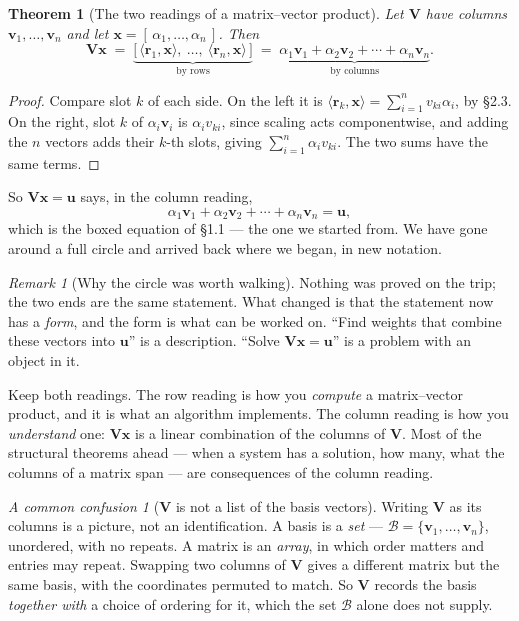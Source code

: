 \documentclass[11pt]{article}
\theoremstyle{plain}
\newtheorem{thm}{Theorem}[section]
\theoremstyle{definition}
\theoremstyle{remark}
\newtheorem*{rmk}{Remark}
\newtheorem*{warn}{A common confusion}
\newcommand{\vc}[1]{\mathbf{#1}}        %
\newcommand{\mt}[1]{\mathbf{#1}}        %
\newcommand{\bas}{\mathcal{B}}
\begin{document}
\begin{thm}[The two readings of a matrix--vector product]
Let $\mt{V}$ have columns $\vc{v}_1,\dots,\vc{v}_n$ and let
$\vc{x}=[\,\alpha_1,\dots,\alpha_n\,]$. Then
\[
  \mt{V}\vc{x}
  \;=\;
  \underbrace{\bigl[\,\langle\vc{r}_1,\vc{x}\rangle,\ \dots,\
                      \langle\vc{r}_n,\vc{x}\rangle\,\bigr]}_{\text{by rows}}
  \;=\;
  \underbrace{\alpha_1\vc{v}_1 + \alpha_2\vc{v}_2 + \cdots
              + \alpha_n\vc{v}_n}_{\text{by columns}} .
\]
\end{thm}

\begin{proof}
Compare slot $k$ of each side. On the left it is
$\langle\vc{r}_k,\vc{x}\rangle=\sum_{i=1}^{n}v_{ki}\alpha_i$, by \S2.3. On the
right, slot $k$ of $\alpha_i\vc{v}_i$ is $\alpha_i v_{ki}$, since scaling acts
componentwise, and adding the $n$ vectors adds their $k$-th slots, giving
$\sum_{i=1}^{n}\alpha_i v_{ki}$. The two sums have the same terms.
\end{proof}

\noindent So $\mt{V}\vc{x}=\vc{u}$ says, in the column reading,
\[
  \alpha_1\vc{v}_1 + \alpha_2\vc{v}_2 + \cdots + \alpha_n\vc{v}_n = \vc{u} ,
\]
which is the boxed equation of \S1.1 --- the one we started from. We have gone
around a full circle and arrived back where we began, in new notation.

\begin{rmk}[Why the circle was worth walking]
Nothing was proved on the trip; the two ends are the same statement. What
changed is that the statement now has a \emph{form}, and the form is what can be
worked on. ``Find weights that combine these vectors into $\vc{u}$'' is a
description. ``Solve $\mt{V}\vc{x}=\vc{u}$'' is a problem with an object in it.

Keep both readings. The row reading is how you \emph{compute} a matrix--vector
product, and it is what an algorithm implements. The column reading is how you
\emph{understand} one: $\mt{V}\vc{x}$ is a linear combination of the columns of
$\mt{V}$. Most of the structural theorems ahead --- when a system has a
solution, how many, what the columns of a matrix span --- are consequences of the
column reading.
\end{rmk}

\begin{warn}[$\mt{V}$ is not a list of the basis vectors]
Writing $\mt{V}$ as its columns is a picture, not an identification. A basis is a
\emph{set} --- $\bas=\{\vc{v}_1,\dots,\vc{v}_n\}$, unordered, with no repeats. A
matrix is an \emph{array}, in which order matters and entries may repeat.
Swapping two columns of $\mt{V}$ gives a different matrix but the same basis,
with the coordinates permuted to match. So $\mt{V}$ records the basis
\emph{together with} a choice of ordering for it, which the set $\bas$ alone does
not supply.
\end{warn}
\end{document}
